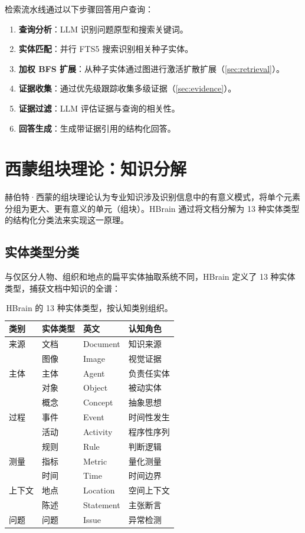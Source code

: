 \documentclass[11pt]{article}
\begin{document}
检索流水线通过以下步骤回答用户查询：

\begin{enumerate}
    \item \textbf{查询分析}：LLM 识别问题原型和搜索关键词。
    \item \textbf{实体匹配}：并行 FTS5 搜索识别相关种子实体。
    \item \textbf{加权 BFS 扩展}：从种子实体通过图进行激活扩散扩展（\cref{sec:retrieval}）。
    \item \textbf{证据收集}：通过优先级跟踪收集多级证据（\cref{sec:evidence}）。
    \item \textbf{证据过滤}：LLM 评估证据与查询的相关性。
    \item \textbf{回答生成}：生成带证据引用的结构化回答。
\end{enumerate}

\section{西蒙组块理论：知识分解}
\label{sec:chunking}

赫伯特·西蒙的组块理论认为专业知识涉及识别信息中的有意义模式，将单个元素分组为更大、更有意义的单元（组块）。HBrain 通过将文档分解为 13 种实体类型的结构化分类法来实现这一原理。

\subsection{实体类型分类}

与仅区分人物、组织和地点的扁平实体抽取系统不同，HBrain 定义了 13 种实体类型，捕获文档中知识的全谱：

\begin{table}[htbp]
\centering
\caption{HBrain 的 13 种实体类型，按认知类别组织。}
\label{tab:entity-types}
\begin{tabular}{@{}llll@{}}
\toprule
\textbf{类别} & \textbf{实体类型} & \textbf{英文} & \textbf{认知角色} \\
\midrule
来源 & 文档 & Document & 知识来源 \\
     & 图像 & Image & 视觉证据 \\
\midrule
主体 & 主体 & Agent & 负责任实体 \\
     & 对象 & Object & 被动实体 \\
     & 概念 & Concept & 抽象思想 \\
\midrule
过程 & 事件 & Event & 时间性发生 \\
     & 活动 & Activity & 程序性序列 \\
     & 规则 & Rule & 判断逻辑 \\
\midrule
测量 & 指标 & Metric & 量化测量 \\
     & 时间 & Time & 时间边界 \\
\midrule
上下文 & 地点 & Location & 空间上下文 \\
       & 陈述 & Statement & 主张断言 \\
\midrule
问题 & 问题 & Issue & 异常检测 \\
\bottomrule
\end{tabular}
\end{table}
\end{document}
